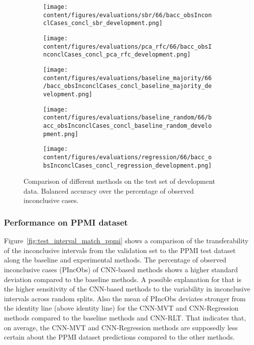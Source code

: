 \begin{figure}[ht]
  \begin{subfigure}{0.45\textwidth}
    \centering
    \texttt{[image: content/figures/evaluations/sbr/66/bacc\_obsInconclCases\_concl\_sbr\_development.png]}
  \end{subfigure}
  \hfill
  \begin{subfigure}{0.45\textwidth}
    \centering
    \texttt{[image: content/figures/evaluations/pca\_rfc/66/bacc\_obsInconclCases\_concl\_pca\_rfc\_development.png]}
  \end{subfigure}
  \hfill
  \begin{subfigure}{0.45\textwidth}
    \centering
    \texttt{[image: content/figures/evaluations/baseline\_majority/66/bacc\_obsInconclCases\_concl\_baseline\_majority\_development.png]}
  \end{subfigure}
  \hfill
  \begin{subfigure}{0.45\textwidth}
    \centering
    \texttt{[image: content/figures/evaluations/baseline\_random/66/bacc\_obsInconclCases\_concl\_baseline\_random\_development.png]}
  \end{subfigure}
  \hfill
  \begin{subfigure}{0.45\textwidth}
    \centering
    \texttt{[image: content/figures/evaluations/regression/66/bacc\_obsInconclCases\_concl\_regression\_development.png]}
  \end{subfigure}

  \caption{Comparison of different methods on the test set of development data. 
  Balanced accuracy over the percentage of observed inconclusive cases.}
  \label{fig:test_dev}
\end{figure}



\subsubsection{Performance on PPMI dataset}


Figure~\ref{fig:test_interval_match_ppmi} shows a comparison of the transferability of the inconclusive intervals 
from the validation set to the PPMI test dataset along the baseline and experimental methods.
The percentage of observed inconclusive cases (PIncObs) of CNN-based methods shows a higher standard deviation 
compared to the baseline methods.
A possible explanation for that is the higher sensitivity of the CNN-based methods 
to the variability in inconclusive intervals across random splits.
Also the mean of PIncObs deviates stronger from the identity line (above identity line) 
for the CNN-MVT and CNN-Regression methods compared to the baseline methods and CNN-RLT.
That indicates that, on average, the CNN-MVT and CNN-Regression methods are supposedly less certain 
about the PPMI dataset predictions compared to the other methods.

